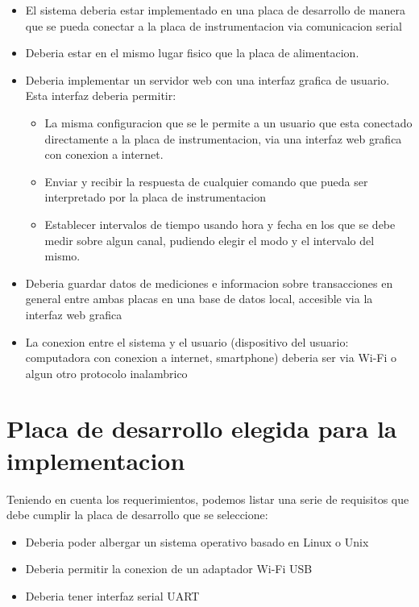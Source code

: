 \begin{itemize}
\item El sistema deberia estar implementado en una placa de desarrollo de manera que se pueda conectar a la placa de instrumentacion via comunicacion serial
\item Deberia estar en el mismo lugar fisico que la placa de alimentacion.
\item Deberia implementar un servidor web con una interfaz grafica de usuario. Esta interfaz deberia permitir:
\begin{itemize}
	\item La misma configuracion que se le permite a un usuario que esta conectado directamente a la placa de instrumentacion, via una interfaz web grafica con conexion a internet. 
	\item Enviar y recibir la respuesta de cualquier comando que pueda ser interpretado por la placa de instrumentacion
	\item Establecer intervalos de tiempo usando hora y fecha en los que se debe medir sobre algun canal, pudiendo elegir el modo y el intervalo del mismo.
\end{itemize}
\item Deberia guardar datos de mediciones e informacion sobre transacciones en general entre ambas placas en una base de datos local, accesible via la interfaz web grafica 
\item La conexion entre el sistema y el usuario (dispositivo del usuario: computadora con conexion a internet, smartphone) deberia ser via Wi-Fi o algun otro protocolo inalambrico
\end{itemize}




\section{Placa de desarrollo elegida para la implementacion} %
\label{sec:placa_de_desarrollo_elegida_para_la_implementacion}

Teniendo en cuenta los requerimientos, podemos listar una serie de requisitos que debe cumplir la placa de desarrollo que se seleccione:

\begin{itemize}
	\item Deberia poder albergar un sistema operativo basado en Linux o Unix
	\item Deberia permitir la conexion de un adaptador Wi-Fi USB
	\item Deberia tener interfaz serial UART
\end{itemize}


